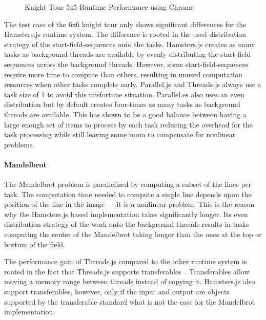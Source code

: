 \begin{figure}
	\centering
	
	\caption{Knight Tour 5x5 Runtime Performance using Chrome}
	\label{fig:runtime-performance-chrome}
\end{figure}

The test case of the 6x6 knight tour only shows significant differences for the Hamsters.js runtime system. The difference is rooted in the used distribution strategy of the start-field-sequences onto the tasks. Hamsters.js creates as many tasks as background threads are available by evenly distributing the start-field-sequences across the background threads. However, some start-field-sequences require more time to compute than others, resulting in unused computation resources when other tasks complete early. Parallel.js and Threads.js always use a task size of 1 to avoid this misfortune situation. Parallel.es also uses an even distribution but by default creates four-times as many tasks as background threads are available. This has shown to be a good balance between having a large enough set of items to process by each task reducing the overhead for the task processing while still leaving some room to compensate for nonlinear problems. 

\paragraph{Mandelbrot}
The Mandelbrot problem is parallelized by computing a subset of the lines per task. The computation time needed to compute a single line depends upon the position of the line in the image --- it is a nonlinear problem. This is the reason why the Hamsters.js based implementation takes significantly longer. Its even distribution strategy of the work onto the background threads results in tasks computing the center of the Mandelbrot taking longer than the ones at the top or bottom of the field. 

The performance gain of Threads.js compared to the other runtime system is rooted in the fact that Threads.js supports transferables~\cite[Section 2.7.4]{w3cHtml5}. Transferables allow moving a memory range between threads instead of copying it. Hamsters.js also support transferables, however, only if the input and output are objects supported by the transferable standard what is not the case for the Mandelbrot implementation.

